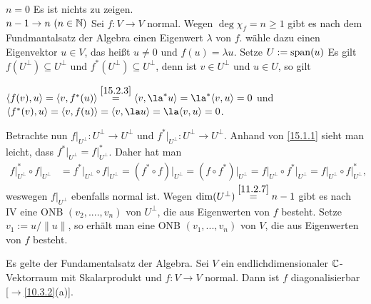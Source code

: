 \documentclass[../../main.tex]{subfiles}
\begin{document}
\begin{cproof}
\underline{$n=0$} Es ist nichts zu zeigen.\\
\underline{$n-1\to n\ (n\in \mathbb N)$} Sei $f: V\to V$ normal. Wegen $\deg \chi_f=n\ge 1$ gibt es nach dem Fundmantalsatz der Algebra einen Eigenwert $\lambda$ von $f$. wähle dazu einen Eigenvektor $u\in V$, das heißt $u\neq 0$ und $f(u)=\lambda u$. Setze $U:=\operatorname{span}(u)$ Es gilt $f(U^\perp)\subseteq U^\perp$ und $f^*(U^\perp)\subseteq U^\perp$, denn ist $v\in U^\perp$ und $u\in U$, so gilt
\begin{center}
$\scal{f(v),u}=\scal{v,f^*(u)}\stackrel{\ref{15.2.3}}{=}\scal{v,\la^*u}=\la^*\scal{v,u}=0$ und\\
$\scal{f^*(v),u}=\scal{v,f(u)}=\scal{v,\la u}=\la\scal{v,u}=0$.
\end{center}
Betrachte nun $f\vert_{U^\perp}: U^{\perp}\to U^{\perp}$ und $f^*\vert_{U^\perp}: U^{\perp}\to U^{\perp}$. Anhand von \ref{15.1.1} sieht man leicht, dass $f^*\vert_{U^\perp}=f\vert^*_{U^\perp}$. Daher hat man
\begin{align*}
f\vert_{U^\perp}^*\circ f\vert_{U^\perp}&=f^*\vert_{U^\perp}\circ f\vert_{U^\perp}=(f^*\circ f)\vert_{U^\perp}=(f\circ f^*)\vert_{U^\perp}=f\vert_{U^\perp}\circ f^*\vert_{U^\perp}=f\vert_{U^\perp}\circ f\vert_{U^\perp}^*,
\end{align*}
weswegen $f\vert_{U^\perp}$ ebenfalls normal ist. Wegen $\dim(U^\perp)\stackrel{\ref{11.2.7}}{=}n-1$ gibt es nach IV eine ONB $(v_2,....,v_n)$ von $U^\perp$, die aus Eigenwerten von $f$ besteht. Setze $v_1:=u/\|u\|$, so erhält man eine ONB $(v_1,...,v_n)$ von $V$, die aus Eigenwerten von $f$ besteht.
\end{cproof}

\begin{kor}\label{15.2.5}
Es gelte der Fundamentalsatz der Algebra. Sei $V$ ein endlichdimensionaler $\mathbb C$-Vektorraum mit Skalarprodukt und $f: V\to V$ normal. Dann ist $f$ diagonalisierbar [$\to$\ref{10.3.2}(a)].
\end{kor}
\end{document}
